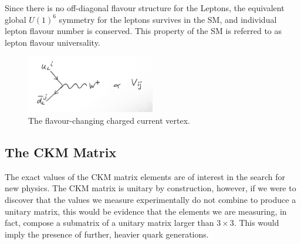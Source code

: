 Since there is no off-diagonal flavour structure for the Leptons, the equivalent global $U(1)^6$ symmetry for the leptons survives in the SM, and individual lepton flavour number is conserved. This property of the SM is referred to as lepton flavour universality.

\begin{figure}
  \begin{center}
    \vspace{-10pt}
    \includegraphics[width=0.5\textwidth]{images/fccc.jpg}
    \vspace{-10pt}
  \end{center}
  \caption{The flavour-changing charged current vertex.}
  \label{fig:fccc}
\end{figure}

\subsection{The CKM Matrix}

The exact values of the CKM matrix elements are of interest in the search for new physics. The CKM matrix is unitary by construction, however, if we were to discover that the values we measure experimentally do not combine to produce a unitary matrix, this would be evidence that the elements we are measuring, in fact, compose a submatrix of a unitary matrix larger than $3\times 3$. This would imply the presence of further, heavier quark generations.



